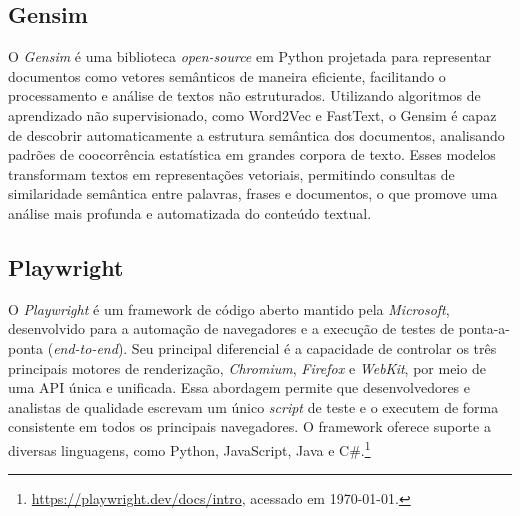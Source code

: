 
\subsection{Gensim}

O \textit{Gensim} é uma biblioteca \textit{open-source} em Python projetada para representar documentos como vetores semânticos de maneira eficiente, facilitando o processamento e análise de textos não estruturados. Utilizando algoritmos de aprendizado não supervisionado, como Word2Vec e FastText, o Gensim é capaz de descobrir automaticamente a estrutura semântica dos documentos, analisando padrões de coocorrência estatística em grandes corpora de texto. Esses modelos transformam textos em representações vetoriais, permitindo consultas de similaridade semântica entre palavras, frases e documentos, o que promove uma análise mais profunda e automatizada do conteúdo textual. \cite{rehurek_lrec}


\subsection{Playwright}
O \textit{Playwright} é um framework de código aberto mantido pela \textit{Microsoft}, desenvolvido para a automação de navegadores e a execução de testes de ponta-a-ponta (\textit{end-to-end}). Seu principal diferencial é a capacidade de controlar os três principais motores de renderização, \textit{Chromium}, \textit{Firefox} e \textit{WebKit}, por meio de uma API única e unificada. Essa abordagem permite que desenvolvedores e analistas de qualidade escrevam um único \textit{script} de teste e o executem de forma consistente em todos os principais navegadores. O framework oferece suporte a diversas linguagens, como Python, JavaScript, Java e C\#.\footnote{\url{https://playwright.dev/docs/intro}, acessado em \today.}


